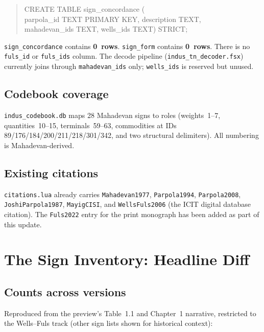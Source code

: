 \documentclass[12pt, a4paper]{article}
\newcommand{\db}[1]{\texttt{#1}}
\begin{document}
\begin{quote}\small\ttfamily
CREATE TABLE sign\_concordance (\\
\hspace*{1em}parpola\_id TEXT PRIMARY KEY, description TEXT,\\
\hspace*{1em}mahadevan\_ids TEXT, wells\_ids TEXT) STRICT;
\end{quote}

\db{sign\_concordance} contains \textbf{0~rows}.
\db{sign\_form} contains \textbf{0~rows}.
There is no \db{fuls\_id} or \db{fuls\_ids} column.
The decode pipeline (\texttt{indus\_tn\_decoder.fsx})
currently joins through \db{mahadevan\_ids} only;
\db{wells\_ids} is reserved but unused.

\subsection{Codebook coverage}

\db{indus\_codebook.db} maps 28 Mahadevan signs to roles
(weights~1--7, quantities~10--15, terminals~59--63,
commodities at IDs 89/176/184/200/211/218/301/342, and two
structural delimiters).  All numbering is Mahadevan-derived.

\subsection{Existing citations}

\texttt{citations.lua} already carries
\texttt{Mahadevan1977},
\texttt{Parpola1994}, \texttt{Parpola2008},
\texttt{JoshiParpola1987}, \texttt{MayigCISI}, and
\texttt{WellsFuls2006} (the ICIT digital database citation).
The \texttt{Fuls2022} entry for the print monograph has been
added as part of this update.

\section{The Sign Inventory: Headline Diff}
\label{sec:headline}

\subsection{Counts across versions}

Reproduced from the preview's Table~1.1 and Chapter~1 narrative,
restricted to the Wells--Fuls track (other sign lists shown for
historical context):
\end{document}
